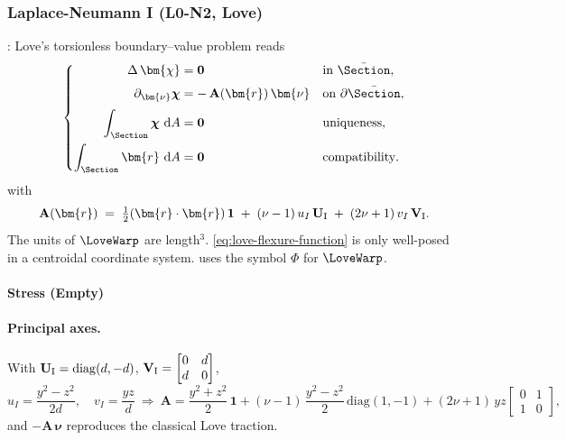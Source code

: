 \subsubsection{Laplace-Neumann I (L0-N2, Love)}
\cite[Art. 229]{love1944treatise}:
Love’s torsionless boundary–value problem reads
\begin{equation}
\left\{
\begin{aligned}
\Delta\,\bm{\chi}&=\mathbf{0} &&\text{in }\bar{\Section},\\[2pt]
\partial_{\bm{\nu}}\boldsymbol{\chi}&= -\,\mathbf A(\bm{r})\,\bm{\nu}
&&\text{on }\partial\bar{\Section},\\[2pt]
\displaystyle\int_{\Section}\boldsymbol{\chi}\mathrm{~d}A&=\mathbf{0} &&\text{uniqueness}, \\
\int_{\Section}\bm{r}\mathrm{~d}A&=\mathbf{0} &&\text{compatibility}.
\end{aligned}
\right.
\label{eq:love-flexure-function}
\end{equation}
with
\begin{equation}
\mathbf A(\bm{r})\;=\;\tfrac12(\bm{r}\cdot\bm{r})\,\mathbf{1}
\;+\;(\nu-1)\,u_I\,\mathbf{U}_{\rm I}
\;+\;(2\nu+1)\,v_I\,\mathbf{V}_{\rm I}.
\end{equation}
The units of \(\LoveWarp\) are length$^3$. 
\cref{eq:love-flexure-function} is only well-posed in a centroidal coordinate system. \cite{sokolnikoffMathematicalTheoryElasticity1946} uses the symbol \(\Phi\) for \(\LoveWarp\).

\paragraph{Stress (Empty)}

\paragraph{Principal axes.}
With $\mathbf{U}_{\rm I}=\mathrm{diag}(d,-d)$, $\mathbf{V}_{\rm I}=\begin{bmatrix}0&d\\ d&0\end{bmatrix}$,
\[
u_I=\frac{y^2-z^2}{2d},\quad v_I=\frac{yz}{d}
\ \Longrightarrow\
\mathbf A
=\frac{y^2+z^2}{2}\,\mathbf{1}
+(\nu-1)\,\frac{y^2-z^2}{2}\,\mathrm{diag}(1,-1)
+(2\nu+1)\,yz
\begin{bmatrix}0&1\\[2pt]1&0\end{bmatrix},
\]
and $-\mathbf A\,\bm{\nu}$ reproduces the classical Love traction.

